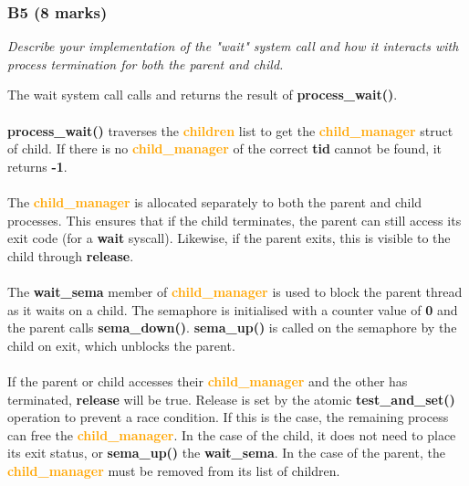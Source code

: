 \documentclass{report}
\newcommand{\question}[1]{\textit{#1} \ }
\newcommand{\fun}[1]{\textcolor{Emerald}{\textbf{#1}}}
\newcommand{\file}[1]{\textcolor{YellowGreen}{\textbf{#1}}}
\newcommand{\struct}[1]{\textcolor{orange}{\textbf{#1}}}
\newcommand{\var}[1]{\textcolor{RoyalPurple}{\textbf{#1}}}
\newcommand{\const}[1]{\textcolor{BrickRed}{\textbf{#1}}}
\newcommand{\pintoscode}[4]{}
\newcommand{\pintosfile}[3]{\pintoscode{#1}{#2}{\file{#3}}{#3}}
\begin{document}
            \subsubsection*{B5 (8 marks)}
                \question{Describe your implementation of the "wait" system call and how it interacts with process termination for both the 
                parent and child.}
                \pintosfile{267}{275}{syscall.c}
									\noindent
                                    The wait system call calls and returns the result of \fun{process\_wait()}.  
                                    \\
                                    \\ \fun{process\_wait()} traverses the \struct{children} list to get the \struct{child\_manager} struct of child. 
                                    If there is no \struct{child\_manager} of the correct \var{tid} cannot be found, it returns \const{-1}.
                                    \\
                                    \\ The \struct{child\_manager} is allocated separately to both the parent and child processes. This ensures that 
                                    if the child terminates, the parent can still access its exit code (for a \fun{wait} syscall). Likewise, if the parent exits, 
                                    this is visible to the child through \var{release}.
                                    \\
                                    \\ The \var{wait\_sema} member of \struct{child\_manager} is used to block the parent thread as it waits on a child. 
                                    The semaphore is initialised with a counter value of \const{0} and the parent calls \fun{sema\_down()}. \fun{sema\_up()} is called
                                    on the semaphore by the child on exit, which unblocks the parent.
                                    \\ 
                                    \\ If the parent or child accesses their \struct{child\_manager} and the other has terminated, \var{release} will be true.
                                    Release is set by the atomic \fun{test\_and\_set()} operation to prevent a race condition.
                                    If this is the case, the remaining process can free the \struct{child\_manager}. 
                                    In the case of the child, it does not need to place its exit status, or \fun{sema\_up()} the \var{wait\_sema}.
                                    In the case of the parent, the \struct{child\_manager} must be removed from its list of children.
\end{document}
